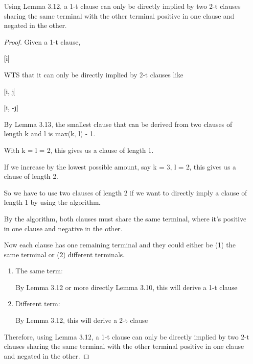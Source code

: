 \documentclass[manuscript]{acmart}
\begin{document}
    \begin{lemma}
        Using Lemma 3.12, a 1-t clause can only be directly implied by two 2-t clauses sharing
        the same terminal with the other terminal positive in one clause and 
        negated in the other.
    \end{lemma}
    \begin{proof}
        Given a 1-t clause, 
        
        [i]

        WTS that it can only be directly implied by 2-t clauses like 

        [i, j]

        [i, -j]

        By Lemma 3.13, the smallest clause that can be derived from two
        clauses of length k and l is max(k, l) - 1.

        With k = l = 2, this gives us a clause of length 1.

        If we increase by the lowest possible amount, say k = 3, l = 2, this
        gives us a clause of length 2.

        So we have to use two clauses of length 2 if we want to directly imply
        a clause of length 1 by using the algorithm.

        By the algorithm, both clauses must share the same terminal, where it's 
        positive in one clause and negative in the other.

        Now each clause has one remaining terminal and they could either be (1)
        the same terminal or (2) different terminals.

        \begin{enumerate}
            \item The same term:
            
            By Lemma 3.12 or more directly Lemma 3.10, this will derive a 1-t clause
            
            \item Different term:
            
            By Lemma 3.12, this will derive a 2-t clause
        \end{enumerate}

        Therefore, using Lemma 3.12, a 1-t clause can only be directly implied by 
        two 2-t clauses sharing the same terminal with the other terminal positive
        in one clause and negated in the other.

    \end{proof}
\end{document}
